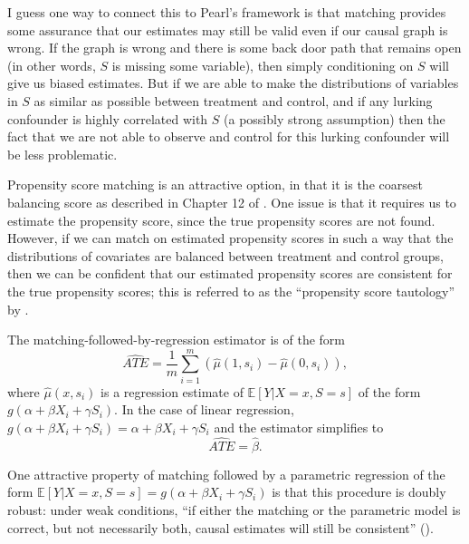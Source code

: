 \documentclass[10pt,a4paper]{article}
\begin{document}
I guess one way to connect this to Pearl's framework is that matching provides some assurance that our estimates may still be valid even if our causal graph is wrong. If the graph is wrong and there is some back door path that remains open (in other words, $S$ is missing some variable), then simply conditioning on $S$ will give us biased estimates. But if we are able to make the distributions of variables in $S$ as similar as possible between treatment and control, and if any lurking confounder is highly correlated with $S$ (a possibly strong assumption) then the fact that we are not able to observe and control for this lurking confounder will be less problematic.

Propensity score matching is an attractive option, in that it is the coarsest balancing score as described in Chapter 12 of \textcite{imbens_rubin}. One issue is that it requires us to estimate the propensity score, since the true propensity scores are not found. However, if we can match on estimated propensity scores in such a way that the distributions of covariates are balanced between treatment and control groups, then we can be confident that our estimated propensity scores are consistent for the true propensity scores; this is referred to as the ``propensity score tautology'' by \textcite{ho_etal}. 

The matching-followed-by-regression estimator is of the form
\[
	\widehat{ATE} = \frac{1}{m} \sum_{i=1}^m (\widehat{\mu}(1, s_i) - \widehat{\mu}(0, s_i)),
\]
where $\widehat{\mu}(x, s_i)$ is a regression estimate of $\mathbb{E}[Y|X = x, S = s]$ of the form $g(\alpha + \beta X_i + \gamma S_i)$. In the case of linear regression, $g(\alpha + \beta X_i + \gamma S_i) = \alpha + \beta X_i + \gamma S_i$ and the estimator simplifies to
\[
	\widehat{ATE} = \widehat{\beta}.
\]

One attractive property of matching followed by a parametric regression of the form $\mathbb{E}[Y|X = x, S = s] = g(\alpha + \beta X_i + \gamma S_i)$ is that this procedure is doubly robust: under weak conditions, ``if either the matching or the parametric model is correct, but not necessarily both, causal estimates will still be consistent'' (\cite{ho_etal}). 


%


\printbibliography
\end{document}
